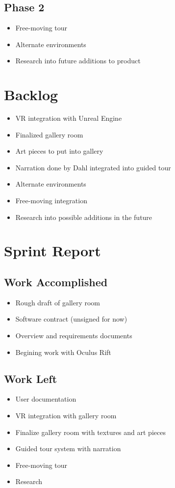 \documentclass[11pt]{book}
\begin{document}
\subsection*{Phase 2}
\begin{itemize}
\item Free-moving tour
\item Alternate environments
\item Research into future additions to product
\end{itemize}

\section*{Backlog}
\hrulefill
\begin{itemize}
\item VR integration with Unreal Engine
\item Finalized gallery room
\item Art pieces to put into gallery
\item Narration done by Dahl integrated into guided tour
\item Alternate environments
\item Free-moving integration
\item Research into possible additions in the future
\end{itemize}

\section*{Sprint Report}
\hrulefill
\subsection*{Work Accomplished}
\begin{itemize}
\item Rough draft of gallery room
\item Software contract (unsigned for now)
\item Overview and requirements documents
\item Begining work with Oculus Rift
\end{itemize}
\subsection*{Work Left}
\begin{itemize}
\item User documentation
\item VR integration with gallery room
\item Finalize gallery room with textures and art pieces
\item Guided tour system with narration
\item Free-moving tour
\item Research
\end{itemize}
\end{document}
